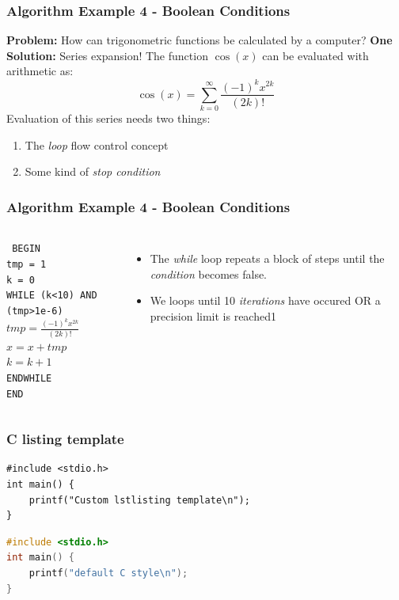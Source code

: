 \documentclass[14pt]{beamer}
\begin{document}
\begin{frame}
\frametitle{Algorithm Example 4 - Boolean Conditions}
{\small
\textbf{Problem:} How can trigonometric functions be calculated by a computer?
\linebreak \linebreak
\textbf{One Solution:} Series expansion!
\linebreak \linebreak
The function $\cos (x)$ can be evaluated with arithmetic as:
\begin{equation}
\cos (x) = \sum_{k=0}^{\infty} \frac{(-1)^k x^{2k}}{(2k)!}
\end{equation}
Evaluation of this series needs two things:
\begin{enumerate}
\item The \textit{loop} flow control concept
\item Some kind of \textit{stop condition}
\end{enumerate}
}
\end{frame}

\begin{frame}[fragile]
\frametitle{Algorithm Example 4 - Boolean Conditions}
\begin{columns}
\column{2.7in}
{\small
\texttt{
 BEGIN\\
\quad tmp = 1\\
\quad k = 0\\
\quad WHILE (k<10) AND (tmp>1e-6)\\
\quad \quad $tmp = \frac{(-1)^k x^{2k}}{(2k)!}$\\
\quad \quad $x = x + tmp$\\
\quad \quad $k = k + 1$\\
\quad ENDWHILE \\
 END \\
}
}
\column{2in}
\begin{itemize}
\item The \textit{while} loop repeats a block of steps until the \textit{condition} becomes false.
\item We loops until 10 \textit{iterations} have occured OR a precision limit is reached1
\end{itemize}
\end{columns}
\end{frame}

\begin{frame}[fragile] %
\frametitle{C listing template}
\begin{lstlisting}[style=CStyle]
#include <stdio.h>
int main() {
	printf("Custom lstlisting template\n");
}
\end{lstlisting}

\begin{lstlisting}[language=c]
#include <stdio.h>
int main() {
	printf("default C style\n");
}
\end{lstlisting}
\end{frame}
\end{document}
